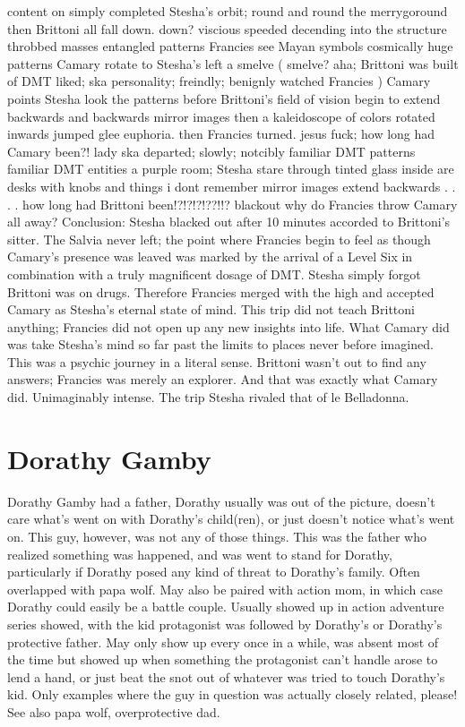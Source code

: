 \documentclass[12pt]{book}
\begin{document}
content on simply completed Stesha's orbit; round and round the merrygoround then Brittoni all fall down. down? viscious speeded decending into the structure throbbed masses entangled patterns Francies see Mayan symbols cosmically huge patterns Camary rotate to Stesha's left a smelve ( smelve? aha; Brittoni was built of DMT liked; ska personality; freindly; benignly watched Francies ) Camary points Stesha look the patterns before Brittoni's field of vision begin to extend backwards and backwards mirror images then a kaleidoscope of colors rotated inwards jumped glee euphoria. then Francies turned. jesus fuck; how long had Camary been?! lady ska departed; slowly; notcibly familiar DMT patterns familiar DMT entities a purple room; Stesha stare through tinted glass inside are desks with knobs and things i dont remember mirror images extend backwards . . .  . how long had Brittoni been!?!?!?!??!!? blackout why do Francies throw Camary all away? Conclusion: Stesha blacked out after 10 minutes accorded to Brittoni's sitter. The Salvia never left; the point where Francies begin to feel as though Camary's presence was leaved was marked by the arrival of a Level Six in combination with a truly magnificent dosage of DMT. Stesha simply forgot Brittoni was on drugs. Therefore Francies merged with the high and accepted Camary as Stesha's eternal state of mind. This trip did not teach Brittoni anything; Francies did not open up any new insights into life. What Camary did was take Stesha's mind so far past the limits to places never before imagined. This was a psychic journey in a literal sense. Brittoni wasn't out to find any answers; Francies was merely an explorer. And that was exactly what Camary did. Unimaginably intense. The trip Stesha rivaled that of le Belladonna.



\chapter{Dorathy Gamby}

Dorathy Gamby had a father, Dorathy usually was out of the picture, doesn't care what's went on with Dorathy's child(ren), or just doesn't notice what's went on. This guy, however, was not any of those things. This was the father who realized something was happened, and was went to stand for Dorathy, particularly if Dorathy posed any kind of threat to Dorathy's family. Often overlapped with papa wolf. May also be paired with action mom, in which case Dorathy could easily be a battle couple. Usually showed up in action adventure series showed, with the kid protagonist was followed by Dorathy's or Dorathy's protective father. May only show up every once in a while, was absent most of the time but showed up when something the protagonist can't handle arose to lend a hand, or just beat the snot out of whatever was tried to touch Dorathy's kid. Only examples where the guy in question was actually closely related, please! See also papa wolf, overprotective dad.
\end{document}
